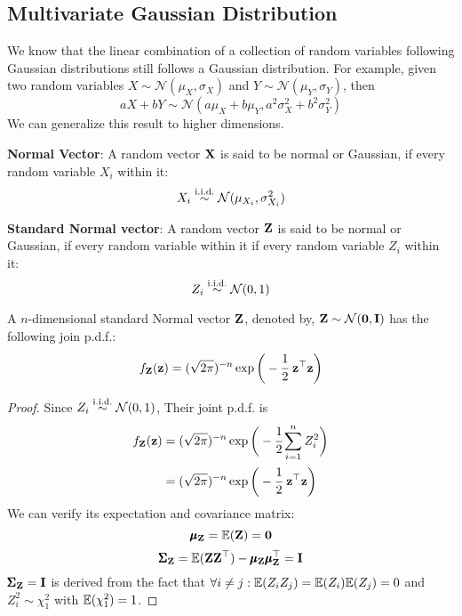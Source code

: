     \subsection{Multivariate Gaussian Distribution}
    We know that the linear combination of a collection of random variables following Gaussian distributions still follows a Gaussian distribution. For example, given two random variables $X\sim \mathcal{N}(\mu_X, \sigma_X)$ and $Y\sim \mathcal{N}(\mu_Y, \sigma_Y)$, then
    \begin{equation}
        aX + bY \sim \mathcal{N}(a\mu_X + b\mu_Y, a^2\sigma_X^2 + b^2\sigma_Y^2)
    \end{equation}
    We can generalize this result to higher dimensions.
    \begin{Def}
        \textbf{Normal Vector}: A random vector $\mathbf{X}$ is said to be normal or Gaussian, if every random variable $X_i$ within it:
        \begin{equation*}
            X_i\overset{\text{i.i.d.}}{\sim} \mathcal{N}(\mu_{X_i}, \sigma^2_{X_i})
        \end{equation*}
    \end{Def}
    \begin{Def}
        \textbf{Standard Normal vector}:
        A random vector $\mathbf{Z}$ is said to be normal or Gaussian, if every random variable within it if every random variable $Z_i$ within it:
        \begin{equation*}
            Z_i\overset{\text{i.i.d.}}{\sim} \mathcal{N}(0, 1)
        \end{equation*}
    \end{Def}
    \begin{Thm}\label{standard-Gaussian-vector}
        A $n$-dimensional standard Normal vector $\mathbf{Z}$, denoted by, $\mathbf{Z}\sim \mathcal{N}(\mathbf{0}, \mathbf{I})$ has the following join p.d.f.:
        \begin{equation*}
            \pdfn{Z} = (\sqrt{2\pi})^{-n}\exp\bigg(-\cfrac{1}{2}\ \T{\B{z}} \B{z}\bigg)
        \end{equation*}
        \begin{proof}
            Since $Z_i\overset{\text{i.i.d.}}{\sim} \mathcal{N}(0, 1)$, Their joint p.d.f. is
            \begin{align*}
                \pdfn{Z} &= (\sqrt{2\pi})^{-n}\exp\bigg(-\cfrac{1}{2} \sum_{i = 1}^n Z_i^2 \bigg)\\
                & = (\sqrt{2\pi})^{-n}\exp\bigg(-\cfrac{1}{2}\ \T{\B{z}} \B{z}\bigg)
            \end{align*}
            We can verify its expectation and covariance matrix:
            \begin{equation*}
                \pmb{\mu}_{\mathbf{Z}} = \mathbb{E}(\mathbf{Z}) = \mathbf{0} 
            \end{equation*}
            \begin{equation*}
                \pmb{\Sigma}_{\mathbf{Z}} = \mathbb{E}(\mathbf{Z}\mathbf{Z}^{\top}) - \pmb{\mu}_{\mathbf{Z}}\pmb{\mu}_{\mathbf{Z}}^{\top} = \mathbf{I}
            \end{equation*}
        $\pmb{\Sigma}_{\mathbf{Z}} = \mathbf{I}$ is derived from the fact that $\forall i\neq j: \mathbb{E}(Z_iZ_j) = \mathbb{E}(Z_i)\mathbb{E}(Z_j) = 0$ and $Z_i^2 \sim \chi^2_{1}$ with $\mathbb{E}(\chi^2_1) = 1$.
        \end{proof}
    \end{Thm}
